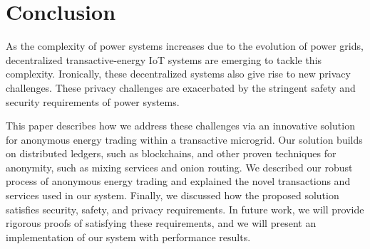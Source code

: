 \section{Conclusion}
\label{sec:concl}

As the complexity of power systems increases due to the evolution of
power grids, decentralized transactive-energy IoT systems are emerging
to tackle this complexity. Ironically, these decentralized systems
also give rise to new privacy challenges. %
These privacy challenges are exacerbated by the stringent safety and
security requirements of power systems.

This paper describes how we address these challenges via an
innovative solution for anonymous energy trading within a transactive
microgrid.  Our solution builds on distributed ledgers, such as
blockchains, and other proven techniques for anonymity, such as mixing
services and onion routing.  We described our robust process of
anonymous energy trading and explained the novel transactions and
services used in our system.  Finally, we discussed how the proposed
solution satisfies security, safety, and privacy requirements.  In
future work, we will provide rigorous proofs of satisfying these
requirements, and we will present an implementation of our system with
performance results.
